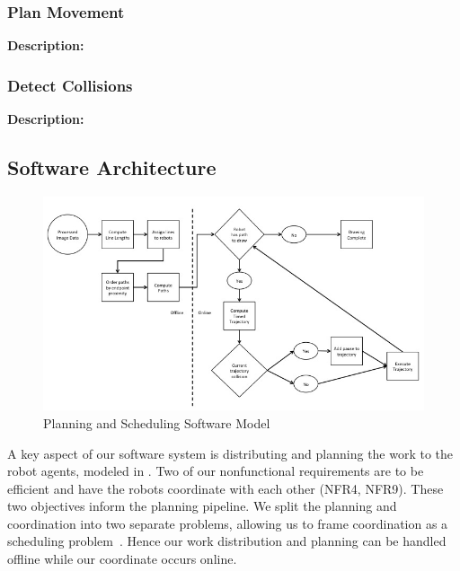 \subsubsection{Plan Movement}
\textbf{Description:} 

\subsubsection{Detect Collisions}
\textbf{Description:} 

\subsection{Software Architecture}
\label{sec:sw_arch_planner}

\begin{figure}[!ht]
 \centering
  \includegraphics[width=0.99\columnwidth]{diagrams/sw_arch_planning.jpg}
	\caption{Planning and Scheduling Software Model}
 \label{fig:planning_processing}
\end{figure}

A key aspect of our software system is distributing and planning the work to the robot agents, modeled in .
Two of our nonfunctional requirements are to be efficient and have the robots coordinate with each other (NFR4, NFR9). These two objectives inform the planning pipeline. We split the planning and coordination into two separate problems, allowing us to frame coordination as a scheduling problem~\cite{o1989deadlock}. Hence our work distribution and planning can be handled offline while our coordinate occurs online.

